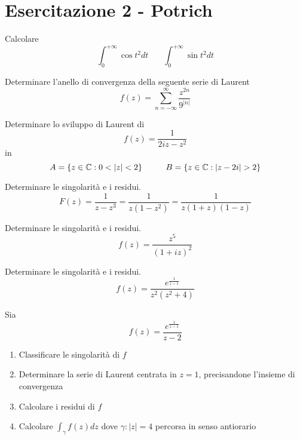 \chapter{Esercitazione 2 - Potrich}
\ParteEsercizi
{}

Calcolare
\begin{equation*}
\int\nolimits ^{+\infty }_{0}\cos t^{2} dt\ \ \ \ \ \ \ \ \int\nolimits ^{+\infty }_{0}\sin t^{2} dt
\end{equation*}
\Esercizio{}

Determinare l'anello di convergenza della seguente serie di Laurent
\begin{equation*}
f\left( z\right) =\sum\limits ^{\infty }_{n=-\infty }\frac{z^{2n}}{9^{\left| n\right| }}
\end{equation*}
\Esercizio{}

Determinare lo sviluppo di Laurent di
\begin{equation*}
f\left( z\right) =\frac{1}{2iz-z^{2}}
\end{equation*}
in
\begin{equation*}
A=\left\{z\in \mathbb{C}  :0< \left| z\right| < 2\right\} \ \ \ \ \ \ \ \ B=\left\{z\in \mathbb{C}  :\left| z-2i\right|  >2\right\}
\end{equation*}
\Esercizio{}

Determinare le singolarità e i residui.
\begin{equation*}
F\left( z\right) =\frac{1}{z-z^{3}} =\frac{1}{z\left( 1-z^{2}\right)} =\frac{1}{z\left( 1+z\right)\left( 1-z\right)}
\end{equation*}
\Esercizio{}

Determinare le singolarità e i residui.
\begin{equation*}
f\left( z\right) =\frac{z^{5}}{\left( 1+iz\right)^{2}}
\end{equation*}
\Esercizio{}

Determinare le singolarità e i residui.
\begin{equation*}
f\left( z\right) =\frac{e^{\frac{1}{z-1}}}{z^{2}\left( z^{2} +4\right)}
\end{equation*}
\Esercizio{}

Sia
\begin{equation*}
f\left( z\right) =\frac{e^{\frac{1}{z-1}}}{z-2}
\end{equation*}
\begin{enumerate}
\item Classificare le singolarità di $f$
\item Determinare la serie di Laurent centrata in $z=1$, precisandone l'insieme di convergenza
\item Calcolare i residui di $f$
\item Calcolare $\int _{\gamma } f\left( z\right) dz$ dove $\gamma :\left| z\right| =4$ percorsa in senso antiorario
\end{enumerate}
\ParteSoluzioni
\Soluzione

